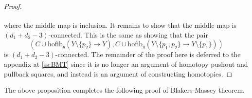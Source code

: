 \begin{prp}
\begin{proof}
{} \\~\\
where the middle map is inclusion. It remains to show that the middle map is $(d_1+d_2-3)$-connected. This is the same as showing that the pair $$(C\cup \text{hofib}_y(Y\setminus\{p_2\}\to Y),C\cup\text{hofib}_y(Y\setminus\{p_1,p_2\}\to Y\setminus\{p_1\}))$$ is $(d_1+d_2-3)$-connected. The remainder of the proof here is deferred to the appendix at \ref{ss:BMT} since it is no longer an argument of homotopy pushout and pullback squares, and instead is an argument of constructing homotopies. 
\end{proof}
\end{prp}

The above proposition completes the following proof of Blakers-Massey theorem. 

